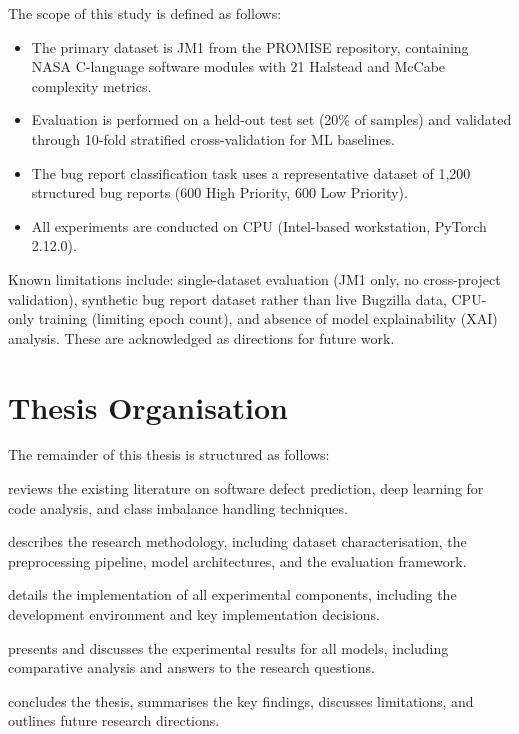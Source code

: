 \documentclass[12pt,a4paper,oneside]{report}
\begin{document}
The scope of this study is defined as follows:

\begin{itemize}
  \item The primary dataset is JM1 from the PROMISE repository, containing NASA C-language software modules with 21 Halstead and McCabe complexity metrics.
  \item Evaluation is performed on a held-out test set (20\% of samples) and validated through 10-fold stratified cross-validation for ML baselines.
  \item The bug report classification task uses a representative dataset of 1,200 structured bug reports (600 High Priority, 600 Low Priority).
  \item All experiments are conducted on CPU (Intel-based workstation, PyTorch 2.12.0).
\end{itemize}

Known limitations include: single-dataset evaluation (JM1 only, no cross-project validation), synthetic bug report dataset rather than live Bugzilla data, CPU-only training (limiting epoch count), and absence of model explainability (XAI) analysis. These are acknowledged as directions for future work.

\section{Thesis Organisation}

The remainder of this thesis is structured as follows:

\begin{description}[leftmargin=2em]
  \item[Chapter 2] reviews the existing literature on software defect prediction, deep learning for code analysis, and class imbalance handling techniques.
  \item[Chapter 3] describes the research methodology, including dataset characterisation, the preprocessing pipeline, model architectures, and the evaluation framework.
  \item[Chapter 4] details the implementation of all experimental components, including the development environment and key implementation decisions.
  \item[Chapter 5] presents and discusses the experimental results for all models, including comparative analysis and answers to the research questions.
  \item[Chapter 6] concludes the thesis, summarises the key findings, discusses limitations, and outlines future research directions.
\end{description}
\end{document}
